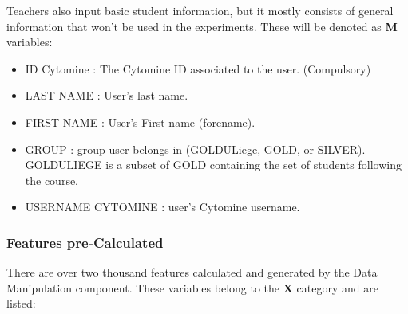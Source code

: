 \documentclass[a4paper,11pt]{report}
\numberwithin{figure}{section} %
\begin{document}
    Teachers also input basic student information, but it mostly consists of general information that won't be used in the experiments.
    These will be denoted as \textbf{M} variables:
   	\begin{itemize}
   	\item[\textbullet] ID Cytomine : The Cytomine ID associated to the user. (Compulsory)
    \item[\textbullet] LAST NAME : User's last name.
    \item[\textbullet] FIRST NAME : User's First name (forename).
    \item[\textbullet] GROUP : group user belongs in (GOLDULiege, GOLD, or SILVER).
    GOLDULIEGE is a subset of GOLD containing the set of students following the course.
    \item[\textbullet] USERNAME CYTOMINE : user's Cytomine username.
   	\end{itemize}
    
    
    \subsubsection{Features pre-Calculated}
    
    There are over two thousand features calculated and generated by the Data Manipulation component.
    These variables belong to the \textbf{X} category and are listed:
   
\end{document}
